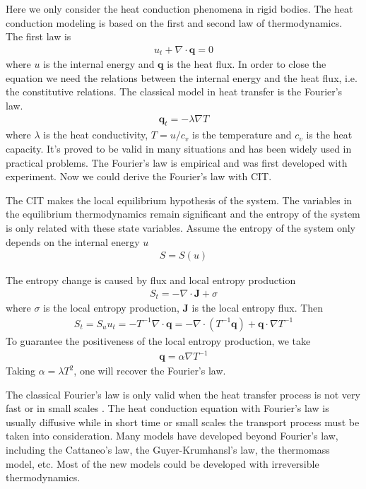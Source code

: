 \documentclass[a4paper]{article}
\begin{document}
Here we only consider the heat conduction phenomena in rigid bodies. The heat conduction modeling is based on the first and second law of thermodynamics. The first law is
\begin{eqnarray}
u_t+\nabla \cdot \mathbf{q}=0
\end{eqnarray}
where $u$ is the internal energy and $\mathbf{q}$ is the heat flux.
In order to close the equation we need the relations between the internal energy and the heat flux, i.e. the constitutive relations. The classical model in heat transfer is the Fourier's law. 
\begin{eqnarray}
\mathbf{q}_t=-\lambda \nabla T
\end{eqnarray}
where $\lambda$ is the heat conductivity, $T=u/c_v$ is the temperature and $c_v$ is the heat capacity.
It's proved to be valid in many situations and has been widely used in practical problems. The Fourier's law is empirical and was first developed with experiment. Now we could derive the Fourier's law with CIT.

The CIT makes the local equilibrium hypothesis of the system. The variables in the equilibrium thermodynamics remain significant and the entropy of the system is only related with these state variables. Assume the entropy of the system only depends on the internal energy $u$
\begin{eqnarray}
S=S(u)
\end{eqnarray}

The entropy change is caused by flux and local entropy production 
\begin{eqnarray}
S_t=-\nabla \cdot \mathbf{J} + \sigma
\end{eqnarray}
where $\sigma$ is the local entropy production, $\mathbf{J}$ is the local entropy flux.
Then
\begin{eqnarray}
S_t=S_u u_t = -T^{-1} \nabla \cdot \mathbf{q} = -\nabla \cdot(T^{-1} \mathbf{q})+ \mathbf{q} \cdot \nabla T^{-1}
\end{eqnarray}
To guarantee the positiveness of the local entropy production, we take
\begin{eqnarray}
\mathbf{q}=\alpha \nabla T^{-1}
\end{eqnarray}
Taking $\alpha={\lambda}{T^2}$, one will recover the Fourier's law.

 The classical Fourier's law is only valid when the heat transfer process is not very fast or in small scales \cite{Jou1996extended}. The heat conduction equation with Fourier's law is usually diffusive while in short time or small scales the transport process must be taken into consideration. Many models have developed beyond Fourier's law, including the Cattaneo's law, the Guyer-Krumhansl's law, the thermomass model, etc. Most of the new models could be developed with irreversible thermodynamics. 
 
\end{document}
